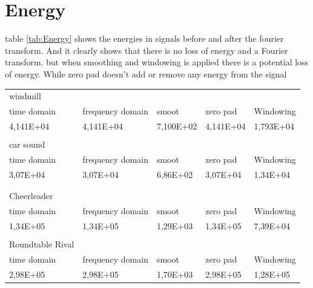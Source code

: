 \section{Energy} 
table \ref{tab:Energy} shows the energies in signals before and after the fourier transform. And it clearly shows that there is no loss of energy and a Fourier transform.
but when smoothing and windowing is applied there is a potential loss of energy. While zero pad doesn't add or remove any energy from the signal
\begin{table}[]
\centering
\begin{tabularx}{\textwidth}{Xllll}
windmill                      &                  &           &           &           \\
time domain                   & frequency domain & smoot     & zero pad  & Windowing \\
4,141E+04                     & 4,141E+04        & 7,100E+02 & 4,141E+04 & 1,793E+04 \\
                              &                  &           &           &           \\
car sound                     &                  &           &           &           \\
time domain                   & frequency domain & smoot     & zero pad  & Windowing \\
3,07E+04                      & 3,07E+04         & 6,86E+02  & 3,07E+04  & 1,34E+04  \\
                              &                  &           &           &           \\
                              &                  &           &           &           \\
Cheerleader                   &                  &           &           &           \\
time domain                   & frequency domain & smoot     & zero pad  & Windowing \\
1,34E+05                      & 1,34E+05         & 1,29E+03  & 1,34E+05  & 7,39E+04  \\
                              &                  &           &           &           \\
Roundtable Rival              &                  &           &           &           \\
time domain                   & frequency domain & smoot     & zero pad  & Windowing \\
2,98E+05                      & 2,98E+05         & 1,70E+03  & 2,98E+05  & 1,28E+05  \\

\end{tabularx}
\end{table}
